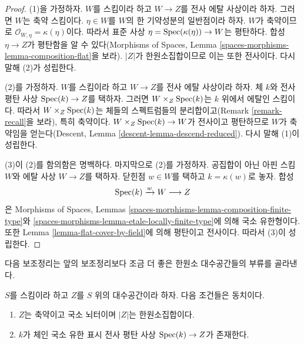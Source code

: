 \begin{proof}
(1)을 가정하자. $W$를 스킴이라 하고 $W \to Z$를 전사 에탈 사상이라
하자. 그러면 $W$는 축약 스킴이다. $\eta \in W$를 $W$의 한
기약성분의 일반점이라 하자. $W$가 축약이므로
$\mathcal{O}_{W, \eta} = \kappa(\eta)$이다. 따라서 표준 사상
$\eta = \mathop{\mathrm{Spec}}(\kappa(\eta)) \to W$는 평탄하다. 합성
$\eta \to Z$가 평탄함을 알 수 있다(Morphisms of Spaces, Lemma
\ref{spaces-morphisms-lemma-composition-flat}을 보라). $|Z|$가
한원소집합이므로 이는 또한 전사이다. 다시 말해 (2)가 성립한다.

\medskip\noindent
(2)를 가정하자. $W$를 스킴이라 하고 $W \to Z$를 전사 에탈
사상이라 하자. 체 $k$와 전사 평탄 사상 $\mathop{\mathrm{Spec}}(k) \to Z$를 택하자.
그러면 $W \times_Z \mathop{\mathrm{Spec}}(k)$는 $k$ 위에서 에탈인 스킴이다. 따라서
$W \times_Z \mathop{\mathrm{Spec}}(k)$는 체들의 스펙트럼들의 분리합이고(Remark
\ref{remark-recall}을 보라), 특히 축약이다.
$W \times_Z \mathop{\mathrm{Spec}}(k) \to W$가 전사이고 평탄하므로 $W$가 축약임을
얻는다(Descent, Lemma \ref{descent-lemma-descend-reduced}). 다시 말해
(1)이 성립한다.

\medskip\noindent
(3)이 (2)를 함의함은 명백하다. 마지막으로 (2)를 가정하자.
공집합이 아닌 아핀 스킴 $W$와 에탈 사상 $W \to Z$를 택하자.
닫힌점 $w \in W$를 택하고 $k = \kappa(w)$로 놓자. 합성
$$
\mathop{\mathrm{Spec}}(k) \xrightarrow{w} W \longrightarrow Z
$$
은 Morphisms of Spaces, Lemmas
\ref{spaces-morphisms-lemma-composition-finite-type}와
\ref{spaces-morphisms-lemma-etale-locally-finite-type}에 의해 국소
유한형이다. 또한 Lemma \ref{lemma-flat-cover-by-field}에 의해
평탄이고 전사이다. 따라서 (3)이 성립한다.
\end{proof}

\noindent
다음 보조정리는 앞의 보조정리보다 조금 더 좋은 한원소 대수공간들의
부류를 골라낸다.

\begin{lemma}
\label{lemma-unique-point-better}
$S$를 스킴이라 하고 $Z$를 $S$ 위의 대수공간이라 하자. 다음 조건들은
동치이다.
\begin{enumerate}
\item $Z$는 축약이고 국소 뇌터이며 $|Z|$는 한원소집합이다.
\item $k$가 체인 국소 유한 표시 전사 평탄 사상
$\mathop{\mathrm{Spec}}(k) \to Z$가 존재한다.
\end{enumerate}
\end{lemma}

